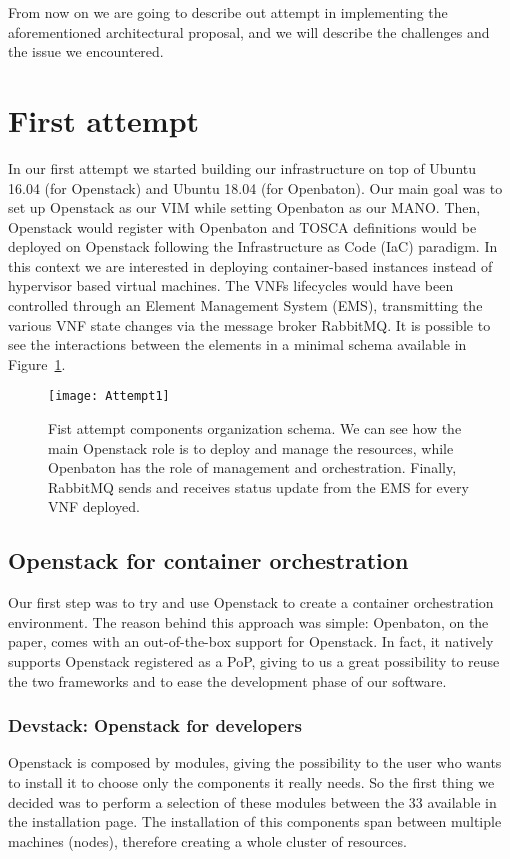 From now on we are going to describe out attempt in implementing the
aforementioned architectural proposal, and we will describe the challenges and
the issue we encountered.

\section{First attempt}

In our first attempt we started building our infrastructure on top of Ubuntu
16.04 (for Openstack) and Ubuntu 18.04 (for Openbaton). Our main goal was to set
up Openstack as our VIM while setting Openbaton as our MANO. Then, Openstack
would register with Openbaton and TOSCA definitions would be deployed on
Openstack following the Infrastructure as Code (IaC) paradigm. In this context
we are interested in deploying container-based instances instead of hypervisor
based virtual machines. The VNFs lifecycles would have been controlled through
an Element Management System (EMS), transmitting the various VNF state changes
via the message broker RabbitMQ. It is possible to see the interactions between
the elements in a minimal schema available in
Figure~\ref{chap:archimpl:sec:fistattempt:img:schema1}.

\begin{figure}[t]
  \centering
  \texttt{[image: Attempt1]}
  \caption[Fist attempt components organization schema]{Fist attempt components
    organization schema. We can see how the main Openstack role is to deploy and
    manage the resources, while Openbaton has the role of management and
    orchestration. Finally, RabbitMQ sends and receives status update from the
    EMS for every VNF deployed.}
  \label{chap:archimpl:sec:fistattempt:img:schema1}
\end{figure}

\subsection{Openstack for container orchestration}

Our first step was to try and use Openstack to create a container orchestration
environment. The reason behind this approach was simple: Openbaton, on the
paper, comes with an out-of-the-box support for Openstack. In fact, it natively
supports Openstack registered as a PoP, giving to us a great possibility to
reuse the two frameworks and to ease the development phase of our software.
\subsubsection{Devstack: Openstack for developers}
Openstack is composed by modules, giving the possibility to the user who wants
to install it to choose only the components it really needs. So the first thing
we decided was to perform a selection of these modules between the 33 available
in the installation page. The installation of this components span between
multiple machines (nodes), therefore creating a whole cluster of resources.


